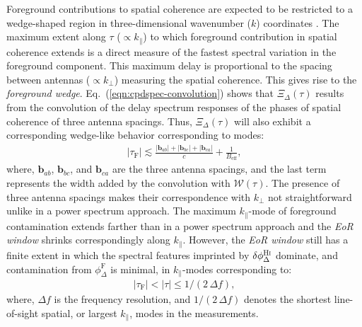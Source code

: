 \documentclass[
reprint,
superscriptaddress,
amsmath,
amssymb,
aps,
prd
]{revtex4-1}
\begin{document}
Foreground contributions to spatial coherence are expected to be restricted to a wedge-shaped region in three-dimensional wavenumber ($k$) coordinates \cite{bow09,liu09,liu14a,liu14b,dat10,liu11,gho12,mor12,par12b,tro12,ved12,dil13,pob13,thy13,thy15a,thy15b,thy16,dil14}. The maximum extent along $\tau$ ($\propto k_\parallel$) to which foreground contribution in spatial coherence extends is a direct measure of the fastest spectral variation in the foreground component. This maximum delay is proportional to the spacing between antennas ($\propto k_\perp$) measuring the spatial coherence. This gives rise to the {\it foreground wedge}. Eq.~(\ref{eqn:cpdspec-convolution}) shows that $\Xi_\Delta(\tau)$ results from the convolution of the delay spectrum responses of the phases of spatial coherence of three antenna spacings. Thus, $\Xi_\Delta(\tau)$ will also exhibit a corresponding wedge-like behavior corresponding to modes:
\begin{align}
  |\tau_\textrm{F}| \lesssim \frac{|\bm{b}_{ab}| + |\bm{b}_{bc}| + |\bm{b}_{ca}|}{c} + \frac{1}{B_\textrm{eff}}, \label{eqn:cp-FG-wedge}
\end{align}
where, $\bm{b}_{ab}$, $\bm{b}_{bc}$, and $\bm{b}_{ca}$ are the three antenna spacings, and the last term represents the width added by the convolution with $\mathcal{W}(\tau)$. The presence of three antenna spacings makes their correspondence with $k_\perp$ not straightforward unlike in a power spectrum approach. The maximum $k_\parallel$-mode of foreground contamination extends farther than in a power spectrum approach and the {\it EoR window} shrinks  correspondingly along $k_\parallel$. However, the {\it EoR window} still has a finite extent in which the spectral features imprinted by $\delta\phi_\Delta^\textrm{H{\sc i}}$ dominate, and contamination from $\phi_\Delta^\textrm{F}$ is minimal, in $k_\parallel$-modes corresponding to:
\begin{align}
  |\tau_\textrm{F}| < |\tau| \leq 1/(2\,\Delta f), \label{eqn:cp-EoR-window}
\end{align}
where, $\Delta f$ is the frequency resolution, and $1/(2\,\Delta f)$ denotes the shortest line-of-sight spatial, or largest $k_\parallel$, modes in the measurements.
\end{document}
